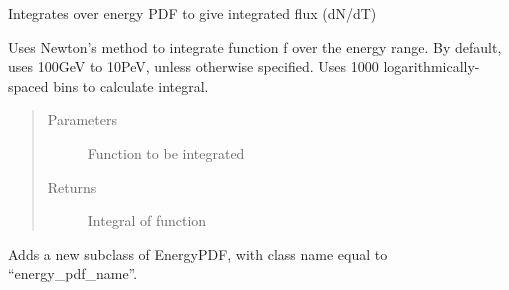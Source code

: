 \documentclass[letterpaper,10pt,english]{sphinxmanual}
\begin{document}
\begin{fulllineitems}
\begin{fulllineitems}
\end{fulllineitems}


\begin{fulllineitems}
\label{\detokenize{index:flarestack.core.energy_pdf.EnergyPDF.flux_integral}}
Integrates over energy PDF to give integrated flux (dN/dT)

\end{fulllineitems}


\begin{fulllineitems}
\label{\detokenize{index:flarestack.core.energy_pdf.EnergyPDF.integrate_over_E}}
Uses Newton’s method to integrate function f over the energy
range. By default, uses 100GeV to 10PeV, unless otherwise specified.
Uses 1000 logarithmically-spaced bins to calculate integral.
\begin{quote}\begin{description}
\item[{Parameters}] \leavevmode
{} \textendash{} Function to be integrated

\item[{Returns}] \leavevmode
Integral of function

\end{description}\end{quote}

\end{fulllineitems}


\begin{fulllineitems}
\label{\detokenize{index:flarestack.core.energy_pdf.EnergyPDF.register_subclass}}
Adds a new subclass of EnergyPDF, with class name equal to
“energy\_pdf\_name”.


\end{fulllineitems}
\end{fulllineitems}
\end{document}
